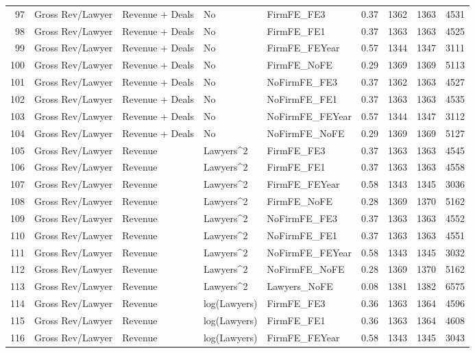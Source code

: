 \documentclass{article}
\begin{document}
\begin{table}[H]
\begin{tabular}{rllllllll}
  97 & Gross Rev/Lawyer & Revenue + Deals & No & FirmFE\_FE3 & 0.37 & 1362 & 1363 & 4531 \\ 
  98 & Gross Rev/Lawyer & Revenue + Deals & No & FirmFE\_FE1 & 0.37 & 1363 & 1363 & 4525 \\ 
  99 & Gross Rev/Lawyer & Revenue + Deals & No & FirmFE\_FEYear & 0.57 & 1344 & 1347 & 3111 \\ 
  100 & Gross Rev/Lawyer & Revenue + Deals & No & FirmFE\_NoFE & 0.29 & 1369 & 1369 & 5113 \\ 
  101 & Gross Rev/Lawyer & Revenue + Deals & No & NoFirmFE\_FE3 & 0.37 & 1362 & 1363 & 4527 \\ 
  102 & Gross Rev/Lawyer & Revenue + Deals & No & NoFirmFE\_FE1 & 0.37 & 1363 & 1363 & 4535 \\ 
  103 & Gross Rev/Lawyer & Revenue + Deals & No & NoFirmFE\_FEYear & 0.57 & 1344 & 1347 & 3112 \\ 
  104 & Gross Rev/Lawyer & Revenue + Deals & No & NoFirmFE\_NoFE & 0.29 & 1369 & 1369 & 5127 \\ 
  105 & Gross Rev/Lawyer & Revenue & Lawyers^2 & FirmFE\_FE3 & 0.37 & 1363 & 1363 & 4545 \\ 
  106 & Gross Rev/Lawyer & Revenue & Lawyers^2 & FirmFE\_FE1 & 0.37 & 1363 & 1363 & 4558 \\ 
  107 & Gross Rev/Lawyer & Revenue & Lawyers^2 & FirmFE\_FEYear & 0.58 & 1343 & 1345 & 3036 \\ 
  108 & Gross Rev/Lawyer & Revenue & Lawyers^2 & FirmFE\_NoFE & 0.28 & 1369 & 1370 & 5162 \\ 
  109 & Gross Rev/Lawyer & Revenue & Lawyers^2 & NoFirmFE\_FE3 & 0.37 & 1363 & 1363 & 4552 \\ 
  110 & Gross Rev/Lawyer & Revenue & Lawyers^2 & NoFirmFE\_FE1 & 0.37 & 1363 & 1363 & 4551 \\ 
  111 & Gross Rev/Lawyer & Revenue & Lawyers^2 & NoFirmFE\_FEYear & 0.58 & 1343 & 1345 & 3032 \\ 
  112 & Gross Rev/Lawyer & Revenue & Lawyers^2 & NoFirmFE\_NoFE & 0.28 & 1369 & 1370 & 5162 \\ 
  113 & Gross Rev/Lawyer & Revenue & Lawyers^2 & Lawyers\_NoFE & 0.08 & 1381 & 1382 & 6575 \\ 
  114 & Gross Rev/Lawyer & Revenue & log(Lawyers) & FirmFE\_FE3 & 0.36 & 1363 & 1364 & 4596 \\ 
  115 & Gross Rev/Lawyer & Revenue & log(Lawyers) & FirmFE\_FE1 & 0.36 & 1363 & 1364 & 4608 \\ 
  116 & Gross Rev/Lawyer & Revenue & log(Lawyers) & FirmFE\_FEYear & 0.58 & 1343 & 1345 & 3043 \\ 

\end{tabular}
\end{table}
\end{document}

